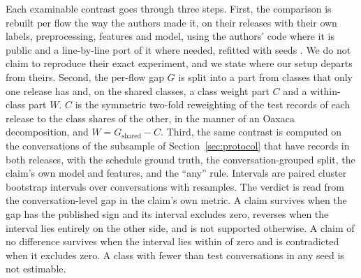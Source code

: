 Each examinable contrast goes through three steps. First, the comparison is rebuilt per flow the way the authors made it, on their releases with their own labels, preprocessing, features and model, using the authors' code where it is public and a line-by-line port of it where needed, refitted with seeds \SetSeeds{}. We do not claim to reproduce their exact experiment, and we state where our setup departs from theirs. Second, the per-flow gap $G$ is split into a part from classes that only one release has and, on the shared classes, a class weight part $C$ and a within-class part $W$. $C$ is the symmetric two-fold reweighting of the test records of each release to the class shares of the other, in the manner of an Oaxaca decomposition, and $W = G_{\mathrm{shared}} - C$. Third, the same contrast is computed on the conversations of the subsample of Section~\ref{sec:protocol} that have records in both releases, with the schedule ground truth, the conversation-grouped split, the claim's own model and features, and the ``any'' rule. Intervals are paired cluster bootstrap intervals over conversations with \SetBoot{} resamples. The verdict is read from the conversation-level gap in the claim's own metric. A claim survives when the gap has the published sign and its interval excludes zero, reverses when the interval lies entirely on the other side, and is not supported otherwise. A claim of no difference survives when the interval lies within  of zero and is contradicted when it excludes zero. A class with fewer than \SetMinTest{} test conversations in any seed is not estimable.
